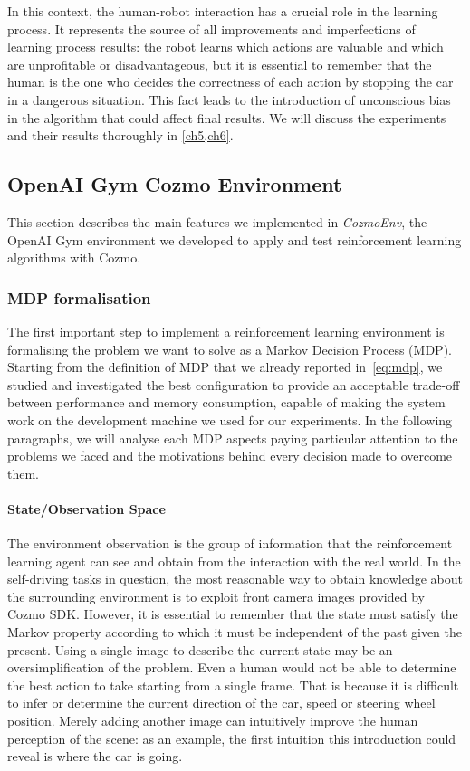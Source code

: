 In this context, the human-robot interaction has a crucial role in the learning process.
It represents the source of all improvements and imperfections of learning process results: the robot learns which actions are valuable and which are unprofitable or disadvantageous, but it is essential to remember that the human is the one who decides the correctness of each action by stopping the car in a dangerous situation.
This fact leads to the introduction of unconscious bias in the algorithm that could affect final results.
We will discuss the experiments and their results thoroughly in \vref{ch5,ch6}.

\subsection{OpenAI Gym Cozmo Environment}

This section describes the main features we implemented in \textit{CozmoEnv}, the OpenAI Gym environment we developed to apply and test reinforcement learning algorithms with Cozmo.

\subsubsection{MDP formalisation}

The first important step to implement a reinforcement learning environment is formalising the problem we want to solve as a Markov Decision Process (MDP).
Starting from the definition of MDP that we already reported in~\vref{eq:mdp}, we studied and investigated the best configuration to provide an acceptable trade-off between performance and memory consumption, capable of making the system work on the development machine we used for our experiments.
In the following paragraphs, we will analyse each MDP aspects paying particular attention to the problems we faced and the motivations behind every decision made to overcome them.

\paragraph{State/Observation Space} The environment observation is the group of information that the reinforcement learning agent can see and obtain from the interaction with the real world.
In the self-driving tasks in question, the most reasonable way to obtain knowledge about the surrounding environment is to exploit front camera images provided by Cozmo SDK.
However, it is essential to remember that the state must satisfy the Markov property according to which it must be independent of the past given the present.
Using a single image to describe the current state may be an oversimplification of the problem.
Even a human would not be able to determine the best action to take starting from a single frame.
That is because it is difficult to infer or determine the current direction of the car, speed or steering wheel position.
Merely adding another image can intuitively improve the human perception of the scene: as an example, the first intuition this introduction could reveal is where the car is going.

